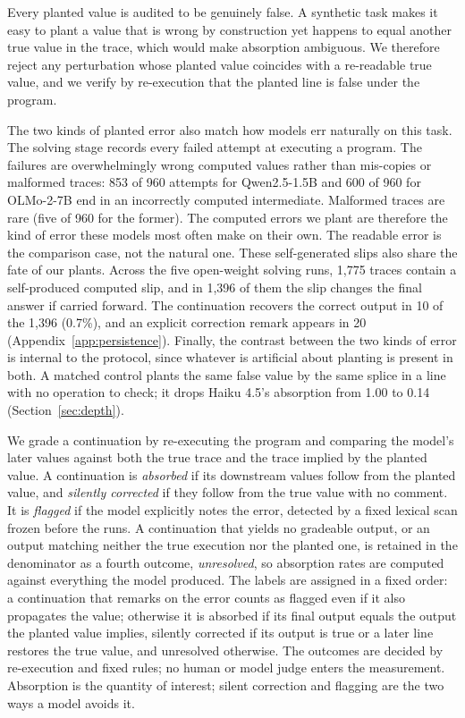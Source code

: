 Every planted value is audited to be genuinely false. A synthetic task makes it easy to plant a value that is wrong by construction yet happens to equal another true value in the trace, which would make absorption ambiguous. We therefore reject any perturbation whose planted value coincides with a re-readable true value, and we verify by re-execution that the planted line is false under the program.

The two kinds of planted error also match how models err naturally on this task. The solving stage records every failed attempt at executing a program. The failures are overwhelmingly wrong computed values rather than mis-copies or malformed traces: 853 of 960 attempts for Qwen2.5-1.5B and 600 of 960 for OLMo-2-7B end in an incorrectly computed intermediate. Malformed traces are rare (five of 960 for the former). The computed errors we plant are therefore the kind of error these models most often make on their own. The readable error is the comparison case, not the natural one. These self-generated slips also share the fate of our plants. Across the five open-weight solving runs, 1{,}775 traces contain a self-produced computed slip, and in 1{,}396 of them the slip changes the final answer if carried forward. The continuation recovers the correct output in 10 of the 1{,}396 (0.7\%), and an explicit correction remark appears in 20 (Appendix~\ref{app:persistence}). Finally, the contrast between the two kinds of error is internal to the protocol, since whatever is artificial about planting is present in both. A matched control plants the same false value by the same splice in a line with no operation to check; it drops Haiku 4.5's absorption from 1.00 to 0.14 (Section~\ref{sec:depth}).

We grade a continuation by re-executing the program and comparing the model's later values against both the true trace and the trace implied by the planted value. A continuation is \emph{absorbed} if its downstream values follow from the planted value, and \emph{silently corrected} if they follow from the true value with no comment. It is \emph{flagged} if the model explicitly notes the error, detected by a fixed lexical scan frozen before the runs. A continuation that yields no gradeable output, or an output matching neither the true execution nor the planted one, is retained in the denominator as a fourth outcome, \emph{unresolved}, so absorption rates are computed against everything the model produced. The labels are assigned in a fixed order: a continuation that remarks on the error counts as flagged even if it also propagates the value; otherwise it is absorbed if its final output equals the output the planted value implies, silently corrected if its output is true or a later line restores the true value, and unresolved otherwise. The outcomes are decided by re-execution and fixed rules; no human or model judge enters the measurement. Absorption is the quantity of interest; silent correction and flagging are the two ways a model avoids it.

